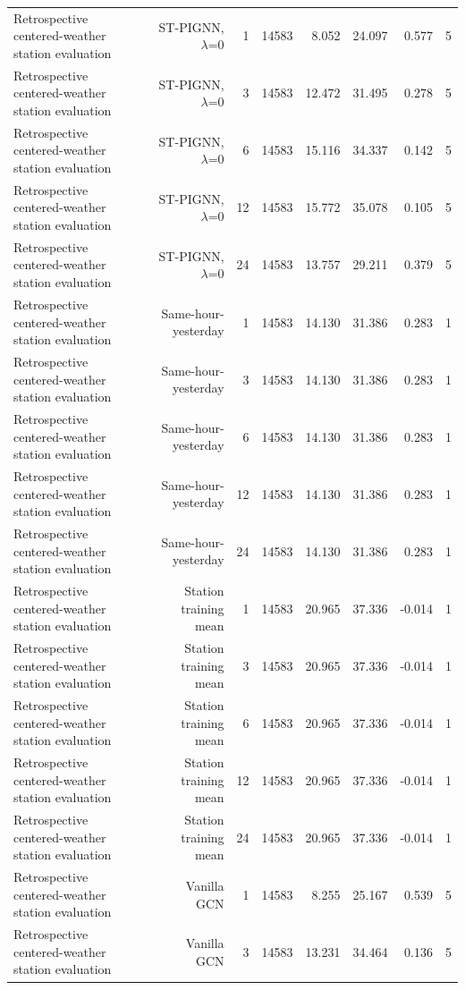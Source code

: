 \begin{table}[t]
\begin{tabular}{lrrrrrrr}
Retrospective centered-weather station evaluation & ST-PIGNN, $\lambda$=0 & 1 & 14583 & 8.052 & 24.097 & 0.577 & 5 \\
Retrospective centered-weather station evaluation & ST-PIGNN, $\lambda$=0 & 3 & 14583 & 12.472 & 31.495 & 0.278 & 5 \\
Retrospective centered-weather station evaluation & ST-PIGNN, $\lambda$=0 & 6 & 14583 & 15.116 & 34.337 & 0.142 & 5 \\
Retrospective centered-weather station evaluation & ST-PIGNN, $\lambda$=0 & 12 & 14583 & 15.772 & 35.078 & 0.105 & 5 \\
Retrospective centered-weather station evaluation & ST-PIGNN, $\lambda$=0 & 24 & 14583 & 13.757 & 29.211 & 0.379 & 5 \\
Retrospective centered-weather station evaluation & Same-hour-yesterday & 1 & 14583 & 14.130 & 31.386 & 0.283 & 1 \\
Retrospective centered-weather station evaluation & Same-hour-yesterday & 3 & 14583 & 14.130 & 31.386 & 0.283 & 1 \\
Retrospective centered-weather station evaluation & Same-hour-yesterday & 6 & 14583 & 14.130 & 31.386 & 0.283 & 1 \\
Retrospective centered-weather station evaluation & Same-hour-yesterday & 12 & 14583 & 14.130 & 31.386 & 0.283 & 1 \\
Retrospective centered-weather station evaluation & Same-hour-yesterday & 24 & 14583 & 14.130 & 31.386 & 0.283 & 1 \\
Retrospective centered-weather station evaluation & Station training mean & 1 & 14583 & 20.965 & 37.336 & -0.014 & 1 \\
Retrospective centered-weather station evaluation & Station training mean & 3 & 14583 & 20.965 & 37.336 & -0.014 & 1 \\
Retrospective centered-weather station evaluation & Station training mean & 6 & 14583 & 20.965 & 37.336 & -0.014 & 1 \\
Retrospective centered-weather station evaluation & Station training mean & 12 & 14583 & 20.965 & 37.336 & -0.014 & 1 \\
Retrospective centered-weather station evaluation & Station training mean & 24 & 14583 & 20.965 & 37.336 & -0.014 & 1 \\
Retrospective centered-weather station evaluation & Vanilla GCN & 1 & 14583 & 8.255 & 25.167 & 0.539 & 5 \\
Retrospective centered-weather station evaluation & Vanilla GCN & 3 & 14583 & 13.231 & 34.464 & 0.136 & 5 \\

\end{tabular}
\end{table}
